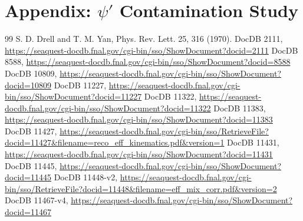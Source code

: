 \documentclass[11pt]{article}
\begin{document}
\section{Appendix: $\psi'$ Contamination Study}
\label{app:psi_prime_study}

\newpage

\clearpage

\newpage

\clearpage

\begin{thebibliography}{99}
     S. D. Drell and T. M. Yan, Phys. Rev. Lett. 25, 316 (1970).
     DocDB 2111, \url{https://seaquest-docdb.fnal.gov/cgi-bin/sso/ShowDocument?docid=2111}
     DocDB 8588, \url{https://seaquest-docdb.fnal.gov/cgi-bin/sso/ShowDocument?docid=8588}
     DocDB 10809, \url{https://seaquest-docdb.fnal.gov/cgi-bin/sso/ShowDocument?docid=10809}
     DocDB 11227, \url{https://seaquest-docdb.fnal.gov/cgi-bin/sso/ShowDocument?docid=11227}
     DocDB 11322, \url{https://seaquest-docdb.fnal.gov/cgi-bin/sso/ShowDocument?docid=11322}
     DocDB 11383, \url{https://seaquest-docdb.fnal.gov/cgi-bin/sso/ShowDocument?docid=11383}
     DocDB 11427, \url{https://seaquest-docdb.fnal.gov/cgi-bin/sso/RetrieveFile?docid=11427&filename=reco_eff_kinematics.pdf&version=1}
     DocDB 11431, \url{https://seaquest-docdb.fnal.gov/cgi-bin/sso/ShowDocument?docid=11431}
     DocDB 11445, \url{https://seaquest-docdb.fnal.gov/cgi-bin/sso/ShowDocument?docid=11445}
     DocDB 11448-v2, \url{https://seaquest-docdb.fnal.gov/cgi-bin/sso/RetrieveFile?docid=11448&filename=eff_mix_corr.pdf&version=2}
     DocDB 11467-v4, \url{https://seaquest-docdb.fnal.gov/cgi-bin/sso/ShowDocument?docid=11467}
\end{thebibliography}
\end{document}
